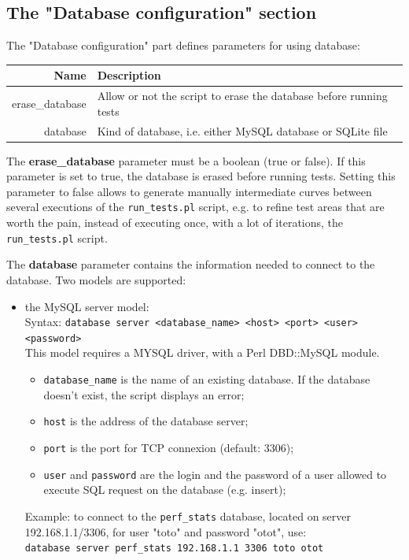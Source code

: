 \documentclass[a4paper,11pt]{article}
\begin{document}
{\subsection{The "Database configuration" section}
\label{sec:sql_config}

The "Database configuration" part defines parameters for using database:
\begin{table}[th]
\begin{center}
\begin{tabular}{|r|l|}
\hline
Name & Description\\
\hline \hline
erase\_database		& Allow or not the script to erase the database before running tests\\
database		& Kind of database, i.e. either MySQL database or SQLite file\\
\hline
\end{tabular}
\end{center}
\end{table}

The \textbf{erase\_database} parameter must be a boolean (true or false).
If this parameter is set to true, the database is erased before running tests.
Setting this parameter to false allows to generate manually intermediate curves between
several executions of the \verb+run_tests.pl+ script, e.g. to refine test areas
that are worth the pain, instead of executing once, with a lot of iterations, the
\verb+run_tests.pl+ script.

The \textbf{database} parameter contains the information needed to connect to the database.
Two models are supported:
\begin{itemize}
\item the MySQL server model: \\
	Syntax: \verb+database server <database_name> <host> <port> <user> <password>+ \\
	This model requires a MYSQL driver, with a Perl DBD::MySQL module.
	\begin{itemize}
	\item
	\verb+database_name+ is the name of an existing database.
	If the database doesn't exist, the script displays an error;
	\item
	\verb+host+ is the address of the database server;
	\item
	\verb+port+ is the port for TCP connexion (default: 3306);
	\item
	\verb+user+ and \verb+password+ are the login and the password of a user allowed to
	execute SQL request on the database (e.g. insert);
	\end{itemize}
	Example: to connect to the \verb+perf_stats+ database, located on server 192.168.1.1/3306,
	for user "toto" and password "otot", use: \\
	\verb+database server perf_stats 192.168.1.1 3306 toto otot+\\


\end{itemize}}
\end{document}

